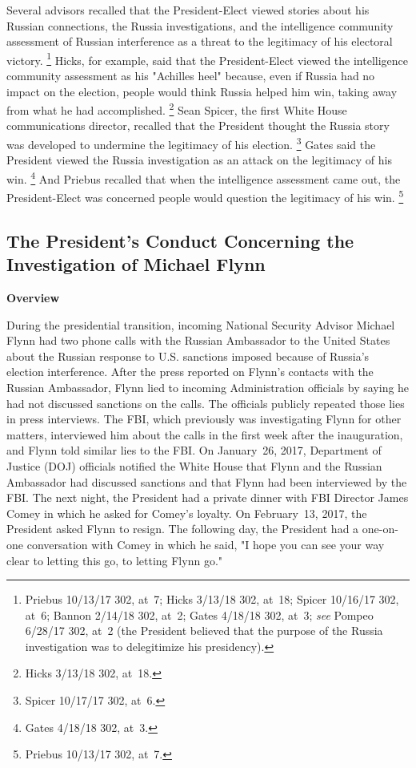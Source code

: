 Several advisors recalled that the President-Elect viewed stories about his Russian connections, the Russia investigations, and the intelligence community assessment of Russian interference as a threat to the legitimacy of his electoral victory.%
\footnote{Priebus 10/13/17 302, at~7;
Hicks 3/13/18 302, at~18;
Spicer 10/16/17 302, at~6;
Bannon 2/14/18 302, at~2;
Gates 4/18/18 302, at~3;
\textit{see} Pompeo 6/28/17 302, at~2 (the President believed that the purpose of the Russia investigation was to delegitimize his presidency).}
Hicks, for example, said that the President-Elect viewed the intelligence community assessment as his "Achilles heel" because, even if Russia had no impact on the election, people would think Russia helped him win, taking away from what he had accomplished.%
\footnote{Hicks 3/13/18 302, at~18.}
Sean Spicer, the first White House communications director, recalled that the President thought the Russia story was developed to undermine the legitimacy of his election.%
\footnote{Spicer 10/17/17 302, at~6.}
Gates said the President viewed the Russia investigation as an attack on the legitimacy of his win.%
\footnote{Gates 4/18/18 302, at~3.}
And Priebus recalled that when the intelligence assessment came out, the President-Elect was concerned people would question the legitimacy of his win.%
\footnote{Priebus 10/13/17 302, at~7.}

\subsection{The President's Conduct Concerning the Investigation of Michael Flynn}

\begin{center}
\textbf{Overview}
\end{center}

During the presidential transition, incoming National Security Advisor Michael Flynn had two phone calls with the Russian Ambassador to the United States about the Russian response to U.S. sanctions imposed because of Russia's election interference.
After the press reported on Flynn's contacts with the Russian Ambassador, Flynn lied to incoming Administration officials by saying he had not discussed sanctions on the calls.
The officials publicly repeated those lies in press interviews.
The FBI, which previously was investigating Flynn for other matters, interviewed him about the calls in the first week after the inauguration, and Flynn told similar lies to the FBI.
On January~26, 2017, Department of Justice (DOJ) officials notified the White House that Flynn and the Russian Ambassador had discussed sanctions and that Flynn had been interviewed by the FBI.
The next night, the President had a private dinner with FBI Director James Comey in which he asked for Comey's loyalty.
On February~13, 2017, the President asked Flynn to resign.
The following day, the President had a one-on-one conversation with Comey in which he said, "I hope you can see your way clear to letting this go, to letting Flynn go."

